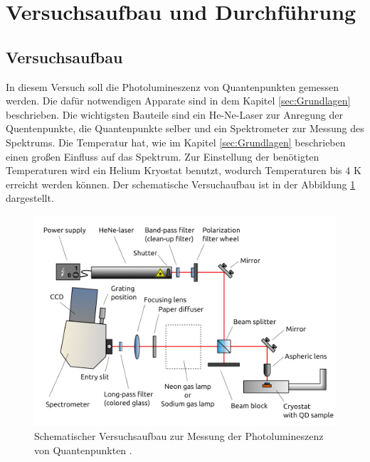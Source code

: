 \section{Versuchsaufbau und Durchf\"uhrung}
\subsection{Versuchsaufbau}
In diesem Versuch soll die Photolumineszenz von Quantenpunkten gemessen werden. Die dafür notwendigen Apparate sind in dem Kapitel \ref{sec:Grundlagen} beschrieben. 
Die wichtigsten Bauteile sind ein He-Ne-Laser zur Anregung der Quentenpunkte, die Quantenpunkte selber und ein Spektrometer zur Messung des Spektrums. 
Die Temperatur hat, wie im Kapitel \ref{sec:Grundlagen} beschrieben einen gro{\ss}en Einfluss auf das Spektrum. 
Zur Einstellung der benötigten Temperaturen wird ein Helium Kryostat benutzt, wodurch Temperaturen bis $4$ K erreicht werden können. 
Der schematische Versuchaufbau ist in der Abbildung \ref{fig:Versuchsaufbau} dargestellt.  
\begin{figure}[H]
\centering
\includegraphics[scale=0.2]{versuchsaufbau.PNG}
\caption{Schematischer Versuchsaufbau zur Messung der Photolumineszenz von Quantenpunkten \cite{anleitung}.   }
\label{fig:Versuchsaufbau}
\end{figure}
